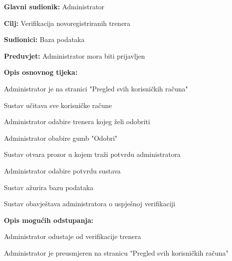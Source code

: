 					

					\noindent {}
					\begin{packed_item}
	
						\item \textbf{Glavni sudionik: } Administrator
						\item  \textbf{Cilj:} Verifikacija  novoregistriranih trenera
						\item  \textbf{Sudionici:} Baza podataka
						\item  \textbf{Preduvjet:} Administrator mora biti prijavljen
						\item  \textbf{Opis osnovnog tijeka:}
						
						\item[] \begin{packed_enum}
	                        
							\item Administrator je na stranici "Pregled svih korisničkih računa"
							\item Sustav učitava sve korisničke račune 
							\item Administrator odabire trenera kojeg želi odobriti
							\item Administrator obabire gumb "Odobri"
							\item Sustav otvara prozor u kojem traži potvrdu administratora
							\item Administrator odabire potvrdu sustava
							\item Sustav ažurira bazu podataka
							\item Sustav obavještava administratora o uspješnoj verifikaciji
							
						\end{packed_enum}
						
						\item  \textbf{Opis mogućih odstupanja:}
						\item[] \begin{packed_item}
	
							\item[4.a] Administrator odustaje od verifikacije trenera
							\item[] \begin{packed_enum}
								
								\item Administrator je preusmjeren na stranicu "Pregled svih korisničkih računa"
								
							\end{packed_enum}
							
								
							
							
						\end{packed_item}						
					\end{packed_item}
					
